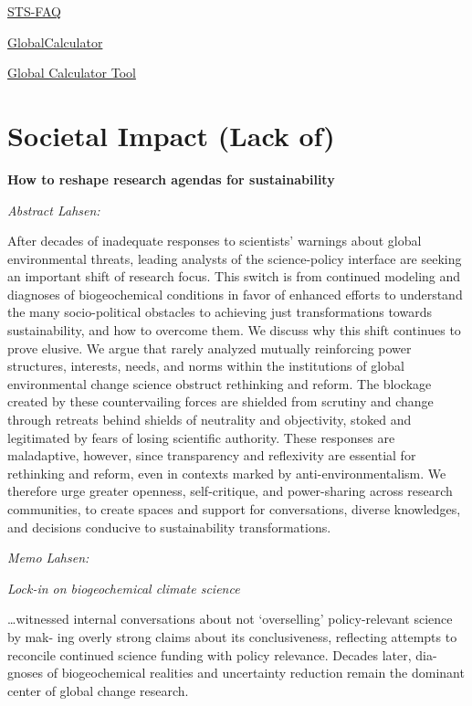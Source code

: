 \documentclass[
]{book}
\begin{document}
\href{https://www.boell.de/en/2020/12/08/faqs-societal-transformation-scenario-sts}{STS-FAQ}

\href{http://www.globalcalculator.org/}{GlobalCalculator}

\href{http://tool.globalcalculator.org/globcalc.html?levers=22rfoe2e13be1111c2c2c1n31hfjdcef222hp233f211111fn2211111111/dashboard/en}{Global Calculator Tool}

\hypertarget{societal-impact-lack-of}{%
\section{Societal Impact (Lack of)}\label{societal-impact-lack-of}}

\textbf{How to reshape research agendas for sustainability}

\emph{Abstract Lahsen:}

After decades of inadequate responses to scientists' warnings about global environmental threats,
leading analysts of the science-policy interface are seeking an important shift of research focus.
This switch is from continued modeling and diagnoses of biogeochemical conditions in
favor of enhanced efforts to understand the many socio-political obstacles to achieving just
transformations towards sustainability, and how to overcome them. We discuss why this shift
continues to prove elusive. We argue that rarely analyzed mutually reinforcing power structures,
interests, needs, and norms within the institutions of global environmental change science obstruct
rethinking and reform. The blockage created by these countervailing forces are shielded from
scrutiny and change through retreats behind shields of neutrality and objectivity, stoked and
legitimated by fears of losing scientific authority. These responses are maladaptive, however, since
transparency and reflexivity are essential for rethinking and reform, even in contexts marked by
anti-environmentalism. We therefore urge greater openness, self-critique, and power-sharing
across research communities, to create spaces and support for conversations, diverse knowledges,
and decisions conducive to sustainability transformations.

\emph{Memo Lahsen:}

\emph{Lock-in on biogeochemical climate science}

\ldots witnessed internal conversations about
not `overselling' policy-relevant science by mak-
ing overly strong claims about its conclusiveness,
reflecting attempts to reconcile continued science
funding with policy relevance. Decades later, dia-
gnoses of biogeochemical realities and uncertainty
reduction remain the dominant center of global
change research.
\end{document}
